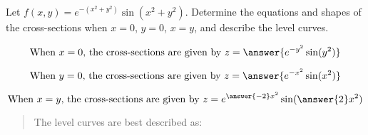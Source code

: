 \documentclass{ximera}
\author{David Guichard \and Neal Koblitz \and H. Jerome Keisler \and Albert Scheller \and Barry Balof \and Mike Wills \and Matthew Carr}
\begin{document}
\begin{exercise}




Let $f(x,y)=e^{-(x^2+y^2)}\sin(x^2+y^2)$. Determine the equations and shapes of the cross-sections when $x=0$, $y=0$, $x=y$, and describe the level curves.

\begin{prompt}
\[
\text{When $x=0$, the cross-sections are given by } z=\answer{e^{-y^2}\sin(y^2)}
\]
\end{prompt}
\begin{prompt}
\[
\text{When $y=0$, the cross-sections are given by } z=\answer{e^{-x^2}\sin(x^2)}
\]
\end{prompt}
\begin{prompt}
\[
\text{When $x=y$, the cross-sections are given by } z=e^{\answer{-2}x^2}\sin(\answer{2}x^2)
\]
\end{prompt}

\begin{quote}
The level curves are best described as:
\end{quote}
\begin{multipleChoice}
\end{multipleChoice}

\end{exercise}
\end{document}
